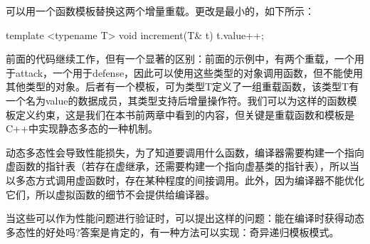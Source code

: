 可以用一个函数模板替换这两个增量重载。更改是最小的，如下所示：

\begin{cpp}
template <typename T>
void increment(T& t) { t.value++; }
\end{cpp}

前面的代码继续工作，但有一个显著的区别：前面的示例中，有两个重载，一个用于attack，一个用于defense，因此可以使用这些类型的对象调用函数，但不能使用其他类型的对象。后者有一个模板，可为类型T定义了一组重载函数，该类型T有一个名为value的数据成员，其类型支持后增量操作符。我们可以为这样的函数模板定义约束，这是我们在本书前两章中看到的内容，但关键是重载函数和模板是C++中实现静态多态的一种机制。

动态多态性会导致性能损失，为了知道要调用什么函数，编译器需要构建一个指向虚函数的指针表（若存在虚继承，还需要构建一个指向虚基类的指针表），所以当以多态方式调用虚函数时，存在某种程度的间接调用。此外，因为编译器不能优化它们，所以虚拟函数的细节不会提供给编译器。

当这些可以作为性能问题进行验证时，可以提出这样的问题：能在编译时获得动态多态性的好处吗?答案是肯定的，有一种方法可以实现：奇异递归模板模式。










































